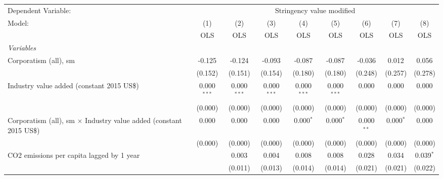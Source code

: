 
\begingroup
\centering
\begin{tabular}{lcccccccc}
   \toprule
   Dependent Variable: & \multicolumn{8}{c}{Stringency value modified}\\
   Model:                                                                     & (1)           & (2)           & (3)           & (4)           & (5)           & (6)          & (7)           & (8)\\  
                                                                              &  OLS          & OLS           & OLS           & OLS           & OLS           & OLS          & OLS           & OLS\\  
   \midrule
   \emph{Variables}\\
   Corporatism (all), sm                                                      & -0.125        & -0.124        & -0.093        & -0.087        & -0.087        & -0.036       & 0.012         & 0.056\\   
                                                                              & (0.152)       & (0.151)       & (0.154)       & (0.180)       & (0.180)       & (0.248)      & (0.257)       & (0.278)\\   
   Industry value added (constant 2015 US\$)                                  & 0.000$^{***}$ & 0.000$^{***}$ & 0.000$^{***}$ & 0.000$^{***}$ & 0.000$^{***}$ & 0.000        & 0.000         & 0.000\\   
                                                                              & (0.000)       & (0.000)       & (0.000)       & (0.000)       & (0.000)       & (0.000)      & (0.000)       & (0.000)\\   
   Corporatism (all), sm $\times$ Industry value added (constant 2015 US\$)   & 0.000         & 0.000         & 0.000         & 0.000$^{*}$   & 0.000$^{*}$   & 0.000$^{**}$ & 0.000$^{*}$   & 0.000\\   
                                                                              & (0.000)       & (0.000)       & (0.000)       & (0.000)       & (0.000)       & (0.000)      & (0.000)       & (0.000)\\   
   CO2 emissions per capita lagged by 1 year                                  &               & 0.003         & 0.004         & 0.008         & 0.008         & 0.028        & 0.034         & 0.039$^{*}$\\   
                                                                              &               & (0.011)       & (0.013)       & (0.014)       & (0.014)       & (0.021)      & (0.021)       & (0.022)\\   

\end{tabular}

